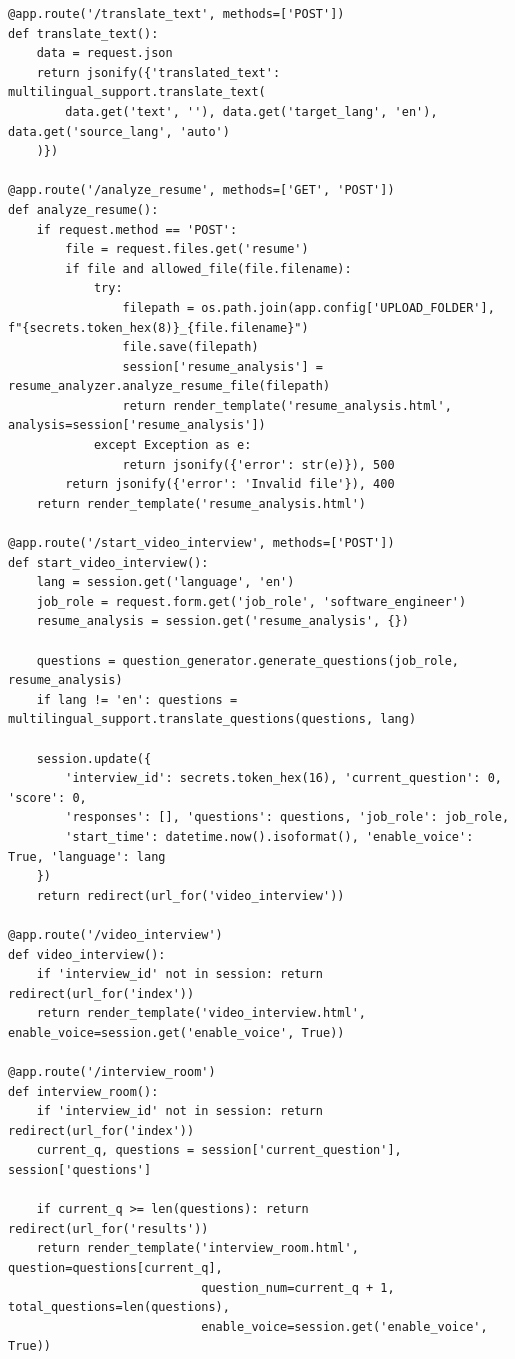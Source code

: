 \documentclass[12pt]{article}
\begin{document}
\begin{lstlisting}[language=Arduino]
@app.route('/translate_text', methods=['POST'])
def translate_text():
    data = request.json
    return jsonify({'translated_text': multilingual_support.translate_text(
        data.get('text', ''), data.get('target_lang', 'en'), data.get('source_lang', 'auto')
    )})

@app.route('/analyze_resume', methods=['GET', 'POST'])
def analyze_resume():
    if request.method == 'POST':
        file = request.files.get('resume')
        if file and allowed_file(file.filename):
            try:
                filepath = os.path.join(app.config['UPLOAD_FOLDER'], f"{secrets.token_hex(8)}_{file.filename}")
                file.save(filepath)
                session['resume_analysis'] = resume_analyzer.analyze_resume_file(filepath)
                return render_template('resume_analysis.html', analysis=session['resume_analysis'])
            except Exception as e:
                return jsonify({'error': str(e)}), 500
        return jsonify({'error': 'Invalid file'}), 400
    return render_template('resume_analysis.html')

@app.route('/start_video_interview', methods=['POST'])
def start_video_interview():
    lang = session.get('language', 'en')
    job_role = request.form.get('job_role', 'software_engineer')
    resume_analysis = session.get('resume_analysis', {})
    
    questions = question_generator.generate_questions(job_role, resume_analysis)
    if lang != 'en': questions = multilingual_support.translate_questions(questions, lang)
    
    session.update({
        'interview_id': secrets.token_hex(16), 'current_question': 0, 'score': 0,
        'responses': [], 'questions': questions, 'job_role': job_role,
        'start_time': datetime.now().isoformat(), 'enable_voice': True, 'language': lang
    })
    return redirect(url_for('video_interview'))

@app.route('/video_interview')
def video_interview():
    if 'interview_id' not in session: return redirect(url_for('index'))
    return render_template('video_interview.html', enable_voice=session.get('enable_voice', True))

@app.route('/interview_room')
def interview_room():
    if 'interview_id' not in session: return redirect(url_for('index'))
    current_q, questions = session['current_question'], session['questions']
    
    if current_q >= len(questions): return redirect(url_for('results'))
    return render_template('interview_room.html', question=questions[current_q], 
                           question_num=current_q + 1, total_questions=len(questions), 
                           enable_voice=session.get('enable_voice', True))


\end{lstlisting}
\end{document}
